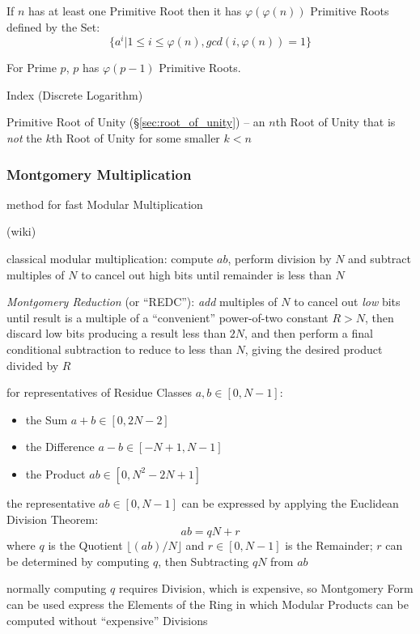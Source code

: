 If $n$ has at least one Primitive Root then it has
$\varphi(\varphi(n))$ Primitive Roots defined by the Set:
\[
  \{ a^i | 1 \leq i \leq \varphi(n), gcd(i,\varphi(n)) = 1 \}
\]

For Prime $p$, $p$ has $\varphi(p-1)$ Primitive Roots.

Index (Discrete Logarithm) %

\fist Primitive Root of Unity (\S\ref{sec:root_of_unity}) -- an $n$th Root of
Unity that is \emph{not} the $k$th Root of Unity for some smaller $k < n$



\subsubsection{Montgomery Multiplication}\label{sec:montgomery_multiplication}

method for fast Modular Multiplication

(wiki)

classical modular multiplication: compute $ab$, perform division by $N$ and
subtract multiples of $N$ to cancel out high bits until remainder is less than
$N$

\emph{Montgomery Reduction} (or ``REDC''): \emph{add} multiples of $N$ to cancel
out \emph{low} bits until result is a multiple of a ``convenient'' power-of-two
constant $R > N$, then discard low bits producing a result less than $2N$, and
then perform a final conditional subtraction to reduce to less than $N$, giving
the desired product divided by $R$

for representatives of Residue Classes $a, b \in [0, N - 1]$:
\begin{itemize}
  \item the Sum $a + b \in [0, 2N -2]$
  \item the Difference $a - b \in [-N + 1, N - 1]$
  \item the Product $ab \in [0, N^2 - 2N + 1]$
\end{itemize}

the representative $ab \in [0, N-1]$ can be expressed by applying the Euclidean
Division Theorem:
\[
  ab = qN + r
\]
where $q$ is the Quotient $\lfloor{(ab) / N}\rfloor$ and $r \in [0, N-1]$ is the
Remainder; $r$ can be determined by computing $q$, then Subtracting $qN$ from
$ab$

normally computing $q$ requires Division, which is expensive, so Montgomery
Form can be used express the Elements of the Ring in which Modular Products can
be computed without ``expensive'' Divisions

